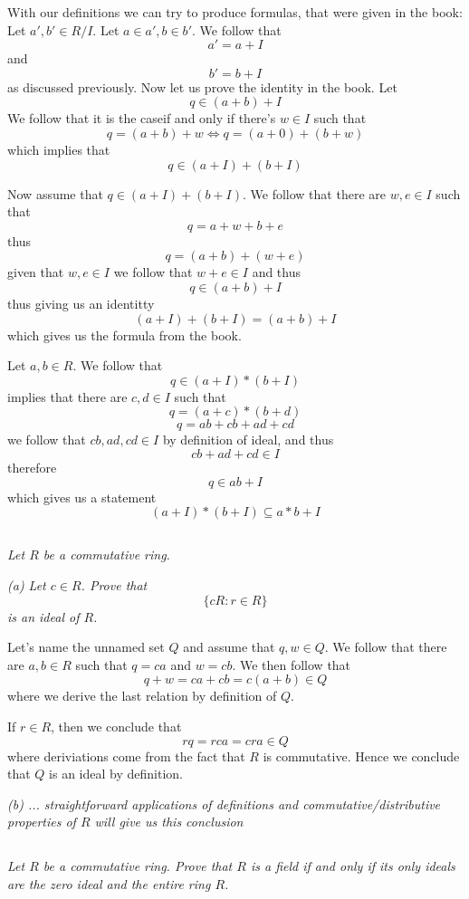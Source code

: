 \documentclass[11pt,oneside,titlepage]{book}
\DeclareMathOperator \lra {\Leftrightarrow}
\newcommand{\set}[1]{\{ #1 \}}
\begin{document}
With our definitions we can try to produce formulas, that were given
in the book: Let $a', b' \in R/I$.  Let $a \in a', b \in b'$. We
follow that
$$a' = a + I$$
and
$$b' = b + I$$
as discussed previously. Now let us prove the identity in the
book. Let
$$q \in (a + b) + I$$
We follow that it is the caseif and only if there's $w \in I$ such
that
$$q = (a + b) + w \lra q = (a + 0) + (b + w)$$
which implies that
$$q \in (a + I) + (b + I)$$

Now assume that $q \in (a + I) + (b + I)$. We follow that there are
$w, e \in I$ such that
$$q = a + w + b + e$$
thus
$$q = (a + b) + (w + e)$$
given that $w, e \in I$ we follow that $w + e \in I$ and thus
$$q \in (a + b) + I$$
thus giving us an identitty
$$(a + I) + (b + I) = (a + b) + I$$
which gives us the formula from the book.

Let $a, b \in R$. We follow that
$$q \in (a + I)  * (b + I)$$
implies that there are $c, d \in I$ such that
$$q = (a + c) * (b + d)$$
$$q = ab + cb + ad + cd$$
we follow that $cb, ad, cd \in I$ by definition of ideal, and thus
$$cb + ad + cd \in I$$
therefore
$$q \in ab + I$$
which gives us a statement
$$(a + I)  * (b + I) \subseteq a * b + I$$


\subsection{}

\textit{Let $R$ be a commutative ring.}

\textit{(a) Let $c \in R$. Prove that
  $$\set{cR: r \in R}$$
  is an ideal of $R$.  }

Let's name the unnamed set $Q$ and assume that $q, w \in Q$. We follow
that there are $a, b \in R$ such that $q = ca$ and $w = cb$. We then
follow that
$$q + w = ca + cb = c(a + b) \in Q$$
where we derive the last relation by definition of $Q$.

If $r \in R$, then we conclude that
$$rq = rca = cra \in Q$$
where deriviations come from the fact that $R$ is commutative. Hence
we conclude that $Q$ is an ideal by definition.

\textit{(b) ... straightforward applications of definitions and
commutative/distributive properties of $R$ will give us this
conclusion}

\subsection{}

\textit{Let $R$ be a commutative ring. Prove that $R$ is a field if
and only if its only ideals are the zero ideal and the entire ring
$R$.}
\end{document}
